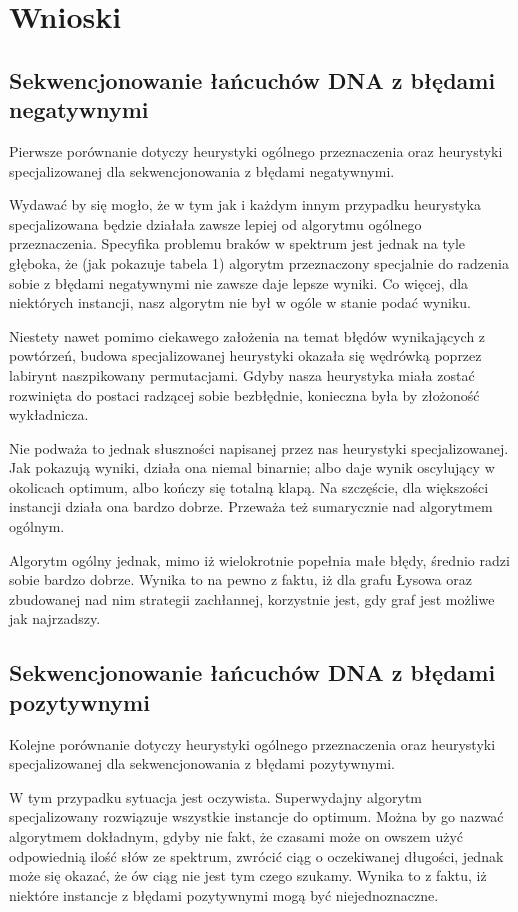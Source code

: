 \documentclass[a4paper]{article}
\begin{document}
\section{Wnioski}

\subsection{Sekwencjonowanie łańcuchów DNA z błędami negatywnymi}

Pierwsze porównanie dotyczy heurystyki ogólnego przeznaczenia oraz heurystyki specjalizowanej dla sekwencjonowania
z błędami negatywnymi.

Wydawać by się mogło, że w tym jak i każdym innym przypadku heurystyka specjalizowana będzie działała zawsze lepiej
od algorytmu ogólnego przeznaczenia. Specyfika problemu braków w spektrum jest jednak na tyle głęboka, że (jak pokazuje
tabela 1) algorytm przeznaczony specjalnie do radzenia sobie z błędami negatywnymi nie zawsze daje lepsze wyniki.
Co więcej, dla niektórych instancji, nasz algorytm nie był w ogóle w stanie podać wyniku.

Niestety nawet pomimo ciekawego założenia na temat błędów wynikających z powtórzeń, budowa specjalizowanej heurystyki
okazała się wędrówką poprzez labirynt naszpikowany permutacjami. Gdyby nasza heurystyka miała zostać rozwinięta do
postaci radzącej sobie bezbłędnie, konieczna była by złożoność wykładnicza.

Nie podważa to jednak słuszności napisanej przez nas heurystyki specjalizowanej. Jak pokazują wyniki, działa ona niemal
binarnie; albo daje wynik oscylujący w okolicach optimum, albo kończy się totalną klapą. Na szczęście, dla większości
instancji działa ona bardzo dobrze. Przeważa też sumarycznie nad algorytmem ogólnym.

Algorytm ogólny jednak, mimo iż wielokrotnie popełnia małe błędy, średnio radzi sobie bardzo dobrze. Wynika to na pewno
z faktu, iż dla grafu Łysowa oraz zbudowanej nad nim strategii zachłannej, korzystnie jest, gdy graf jest możliwe jak
najrzadszy.

\subsection{Sekwencjonowanie łańcuchów DNA z błędami pozytywnymi}

Kolejne porównanie dotyczy heurystyki ogólnego przeznaczenia oraz heurystyki specjalizowanej dla sekwencjonowania
z błędami pozytywnymi.

W tym przypadku sytuacja jest oczywista. Superwydajny algorytm specjalizowany rozwiązuje wszystkie instancje do optimum.
Można by go nazwać algorytmem dokładnym, gdyby nie fakt, że czasami może on owszem użyć odpowiednią ilość słów ze spektrum,
zwrócić ciąg o oczekiwanej długości, jednak może się okazać, że ów ciąg nie jest tym czego szukamy. Wynika to z faktu, iż
niektóre instancje z błędami pozytywnymi mogą być niejednoznaczne.
\end{document}
